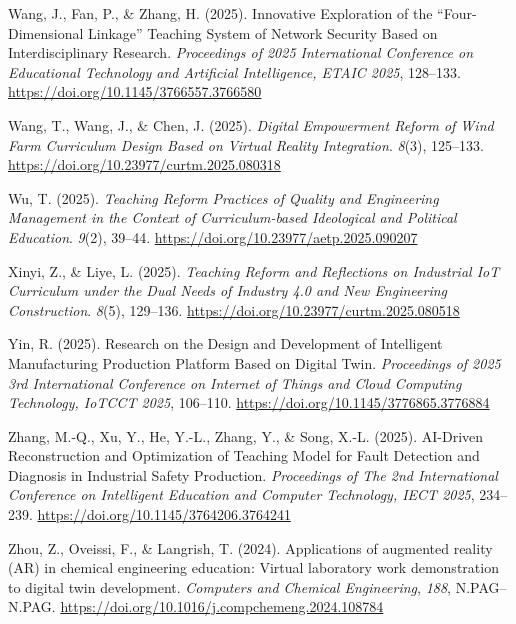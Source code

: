 Wang, J., Fan, P., \& Zhang, H. (2025). Innovative Exploration of the
``Four-Dimensional Linkage'' Teaching System of Network Security Based on
Interdisciplinary Research. \emph{Proceedings of 2025 International
Conference on Educational Technology and Artificial Intelligence, ETAIC
2025}, 128--133. \url{https://doi.org/10.1145/3766557.3766580}

Wang, T., Wang, J., \& Chen, J. (2025). \emph{Digital Empowerment Reform of
Wind Farm Curriculum Design Based on Virtual Reality Integration}.
\emph{8}(3), 125--133. \url{https://doi.org/10.23977/curtm.2025.080318}

Wu, T. (2025). \emph{Teaching Reform Practices of Quality and Engineering
Management in the Context of Curriculum-based Ideological and Political
Education}. \emph{9}(2), 39--44. \url{https://doi.org/10.23977/aetp.2025.090207}

Xinyi, Z., \& Liye, L. (2025). \emph{Teaching Reform and Reflections on
Industrial IoT Curriculum under the Dual Needs of Industry 4.0 and New
Engineering Construction}. \emph{8}(5), 129--136.
\url{https://doi.org/10.23977/curtm.2025.080518}

Yin, R. (2025). Research on the Design and Development of Intelligent
Manufacturing Production Platform Based on Digital Twin. \emph{Proceedings of
2025 3rd International Conference on Internet of Things and Cloud
Computing Technology, IoTCCT 2025}, 106--110.
\url{https://doi.org/10.1145/3776865.3776884}

Zhang, M.-Q., Xu, Y., He, Y.-L., Zhang, Y., \& Song, X.-L. (2025).
AI-Driven Reconstruction and Optimization of Teaching Model for Fault
Detection and Diagnosis in Industrial Safety Production. \emph{Proceedings of
The 2nd International Conference on Intelligent Education and Computer
Technology, IECT 2025}, 234--239.
\url{https://doi.org/10.1145/3764206.3764241}

Zhou, Z., Oveissi, F., \& Langrish, T. (2024). Applications of augmented
reality (AR) in chemical engineering education: Virtual laboratory work
demonstration to digital twin development. \emph{Computers and Chemical
Engineering}, \emph{188}, N.PAG--N.PAG.
\url{https://doi.org/10.1016/j.compchemeng.2024.108784}

